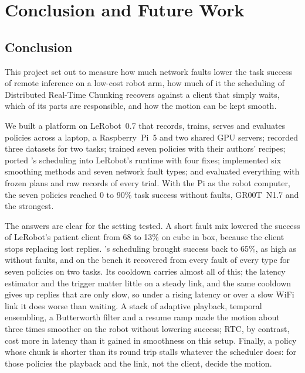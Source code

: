 \chapter{Conclusion and Future Work}\label{ch:conclusion}

\section{Conclusion}
This project set out to measure how much network faults lower the task success of remote inference on a low-cost
robot arm, how much of it the scheduling of Distributed Real-Time Chunking recovers against a client that simply waits,
which of its parts are responsible, and how the motion can be kept smooth.

We built a platform on LeRobot~0.7 that records, trains, serves and evaluates policies across a laptop, a
Raspberry~Pi~5 and two shared GPU servers; recorded three datasets for two tasks; trained seven policies with their
authors' recipes; ported \drtc's scheduling into LeRobot's runtime with four fixes; implemented six smoothing methods and
seven network fault types; and evaluated everything with frozen plans and raw records of every trial. With the Pi as
the robot computer, the seven policies reached 0 to 90\% task success without faults, GR00T~N1.7 and \smolvla{} the
strongest.

The answers are clear for the setting tested. A short fault mix lowered the success of LeRobot's patient client from
68 to 13\% on cube in box, because the client stops replacing lost replies. \drtc's scheduling brought success back to
65\%, as high as without faults, and on the bench it recovered from every fault of every type for seven policies on two
tasks. Its cooldown carries almost all of this; the latency estimator and the trigger matter little on a steady link,
and the same cooldown gives up replies that are only slow, so under a rising latency or over a slow WiFi link it does
worse than waiting. A stack of adaptive playback, temporal ensembling, a Butterworth filter and a resume ramp made the
motion about three times smoother on the robot without lowering success; RTC, by contrast, cost more in latency than it
gained in smoothness on this setup. Finally, a policy whose chunk is shorter than its round trip stalls whatever the
scheduler does: for those policies the playback and the link, not the client, decide the motion.


